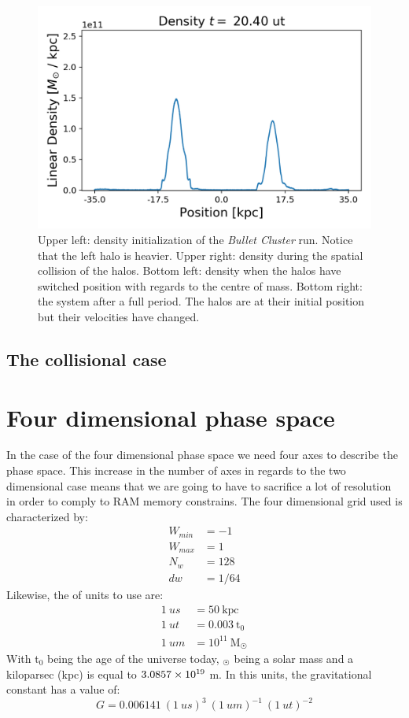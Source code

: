 \begin{figure}[h!]
    \includegraphics[scale=0.45]{imag/bulletD51.png}
    \caption{Upper left: density initialization of the \emph{Bullet Cluster} run. Notice that the left halo is heavier. Upper right: density during the spatial collision of the halos. Bottom left: density when the halos have switched position with regards to the centre of mass. Bottom right: the system after a full period. The halos are at their initial position but their velocities have changed.}
    \label{densNoColBullet}
\end{figure}


\newpage
\subsection{The collisional case}












\newpage
\section{Four dimensional phase space}
In the case of the four dimensional phase space we need four axes to describe the phase space. This increase in the number of axes in regards to the two dimensional case means that we are going to have to sacrifice a lot of resolution in order to comply to RAM memory constrains. The four dimensional grid used is characterized by:
\begin{align}
W_{min} &= -1\\
W_{max} &= 1\\
N_w &= 128\\
dw &= 1/64
\end{align}
Likewise, the of units to use are:
\begin{align}
1\ us &= 50\ \text{kpc}\\
1\ ut &= 0.003 \ \text{t}_0\\
1\ um &= 10^{11} \ \text{M}_{\astrosun}
\end{align}
With t$_0$ being the age of the universe today, $_{\astrosun}$ being a solar mass and a kiloparsec (kpc) is equal to $3.0857\times 10^{19}$ m. In this units, the gravitational constant has a value of:
\begin{equation}
G = 0.006141 \ (1 \ us)^3 \ (1 \ um)^{-1} \ (1 \ ut)^{-2}
\end{equation}
